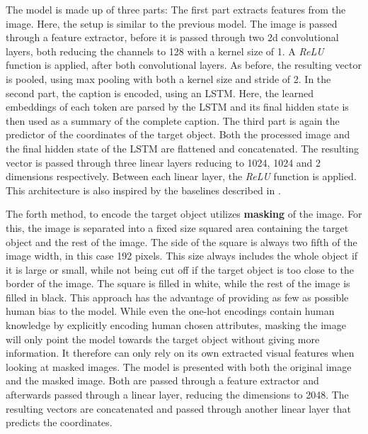 The model is made up of three parts:
The first part extracts features from the image.
Here, the setup is similar to the previous model.
The image is passed through a feature extractor, before it is passed through two 2d convolutional layers, both reducing the channels to 128 with a kernel size of 1.
A \emph{ReLU} function is applied, after both convolutional layers.
As before, the resulting vector is pooled, using max pooling with both a kernel size and stride of 2.
In the second part, the caption is encoded, using an LSTM.
Here, the learned embeddings of each token are parsed by the LSTM and its final hidden state is then used as a summary of the complete caption.
The third part is again the predictor of the coordinates of the target object.
Both the processed image and the final hidden state of the LSTM are flattened and concatenated.
The resulting vector is passed through three linear layers reducing to 1024, 1024 and 2 dimensions respectively.
Between each linear layer, the \emph{ReLU} function is applied.
This architecture is also inspired by the baselines described in \citep{Johnson2017}.

The forth method, to encode the target object utilizes \textbf{masking} of the image.
For this, the image is separated into a fixed size squared area containing the target object and the rest of the image.
The side of the square is always two fifth of the image width, in this case 192 pixels.
This size always includes the whole object if it is large or small, while not being cut off if the target object is too close to the border of the image.
The square is filled in white, while the rest of the image is filled in black.
This approach has the advantage of providing as few as possible human bias to the model.
While even the one-hot encodings contain human knowledge by explicitly encoding human chosen attributes, masking the image will only point the model towards the target object without giving more information.
It therefore can only rely on its own extracted visual features when looking at masked images.
The model is presented with both the original image and the masked image.
Both are passed through a feature extractor and afterwards passed through a linear layer, reducing the dimensions to 2048.
The resulting vectors are concatenated and passed through another linear layer that predicts the coordinates.

